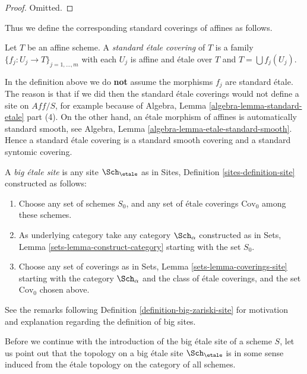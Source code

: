 \begin{proof}
Omitted.
\end{proof}

\noindent
Thus we define the corresponding standard coverings of affines as follows.

\begin{definition}
\label{definition-standard-etale}
Let $T$ be an affine scheme. A {\it standard \'etale covering}
of $T$ is a family $\{f_j : U_j \to T\}_{j = 1, \ldots, m}$
with each $U_j$ is affine and \'etale over $T$ and
$T = \bigcup f_j(U_j)$.
\end{definition}

\noindent
In the definition above we do {\bf not} assume the morphisms $f_j$ are
standard \'etale. The reason is that if we did then the standard \'etale
coverings would not define a site on $\textit{Aff}/S$, for example because of
Algebra, Lemma \ref{algebra-lemma-standard-etale} part (4).
On the other hand, an \'etale morphism of affines is automatically
standard smooth, see
Algebra, Lemma \ref{algebra-lemma-etale-standard-smooth}.
Hence a standard \'etale covering is a standard smooth
covering and a standard syntomic covering.

\begin{definition}
\label{definition-big-etale-site}
A {\it big \'etale site} is any site $\Sch_\etale$ as in
Sites, Definition \ref{sites-definition-site} constructed as follows:
\begin{enumerate}
\item Choose any set of schemes $S_0$, and any set of \'etale coverings
$\text{Cov}_0$ among these schemes.
\item As underlying category take any category $\Sch_\alpha$
constructed as in Sets, Lemma \ref{sets-lemma-construct-category}
starting with the set $S_0$.
\item Choose any set of coverings as in
Sets, Lemma \ref{sets-lemma-coverings-site} starting with the
category $\Sch_\alpha$ and the class of \'etale coverings,
and the set $\text{Cov}_0$ chosen above.
\end{enumerate}
\end{definition}

\noindent
See the remarks following Definition \ref{definition-big-zariski-site}
for motivation and explanation regarding the definition of big sites.

\medskip\noindent
Before we continue with the introduction of the big \'etale site of
a scheme $S$, let us point out that the topology on a big \'etale site
$\Sch_\etale$ is in some sense induced from the \'etale
topology on the category of all schemes.

